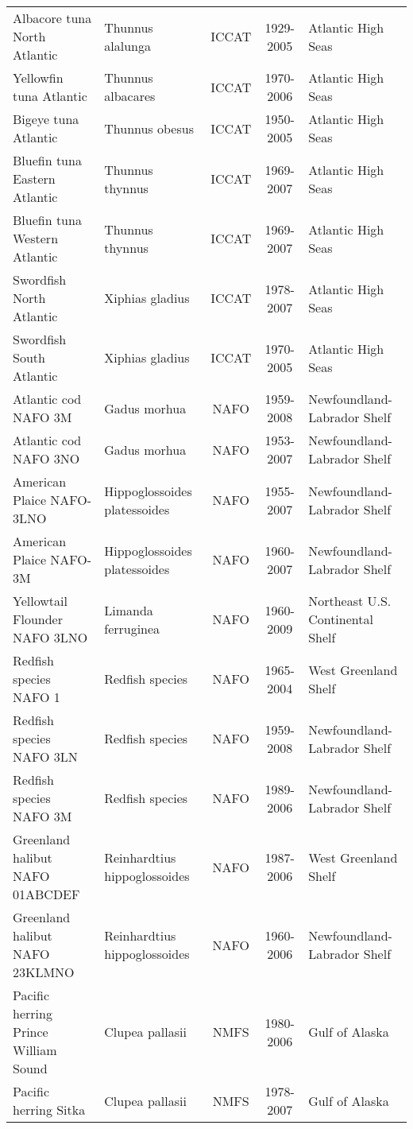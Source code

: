 \begin{longtable}{p{4cm}p{3.5cm}ccp{5.5cm}}
  Albacore tuna North Atlantic & Thunnus alalunga & ICCAT & 1929-2005 & Atlantic High Seas \\ 
  Yellowfin tuna Atlantic & Thunnus albacares & ICCAT & 1970-2006 & Atlantic High Seas \\ 
  Bigeye tuna Atlantic & Thunnus obesus & ICCAT & 1950-2005 & Atlantic High Seas \\ 
  Bluefin tuna Eastern Atlantic & Thunnus thynnus & ICCAT & 1969-2007 & Atlantic High Seas \\ 
  Bluefin tuna Western Atlantic & Thunnus thynnus & ICCAT & 1969-2007 & Atlantic High Seas \\ 
  Swordfish North Atlantic & Xiphias gladius & ICCAT & 1978-2007 & Atlantic High Seas \\ 
  Swordfish South Atlantic & Xiphias gladius & ICCAT & 1970-2005 & Atlantic High Seas \\ 
  Atlantic cod NAFO 3M & Gadus morhua & NAFO & 1959-2008 & Newfoundland-Labrador Shelf \\ 
  Atlantic cod NAFO 3NO & Gadus morhua & NAFO & 1953-2007 & Newfoundland-Labrador Shelf \\ 
  American Plaice NAFO-3LNO & Hippoglossoides platessoides & NAFO & 1955-2007 & Newfoundland-Labrador Shelf \\ 
  American Plaice NAFO-3M & Hippoglossoides platessoides & NAFO & 1960-2007 & Newfoundland-Labrador Shelf \\ 
  Yellowtail Flounder NAFO 3LNO & Limanda ferruginea & NAFO & 1960-2009 & Northeast U.S. Continental Shelf \\ 
  Redfish species NAFO 1 & Redfish species & NAFO & 1965-2004 & West Greenland Shelf \\ 
  Redfish species NAFO 3LN & Redfish species & NAFO & 1959-2008 & Newfoundland-Labrador Shelf \\ 
  Redfish species NAFO 3M & Redfish species & NAFO & 1989-2006 & Newfoundland-Labrador Shelf \\ 
  Greenland halibut NAFO 01ABCDEF & Reinhardtius hippoglossoides & NAFO & 1987-2006 & West Greenland Shelf \\ 
  Greenland halibut NAFO 23KLMNO & Reinhardtius hippoglossoides & NAFO & 1960-2006 & Newfoundland-Labrador Shelf \\ 
  Pacific herring Prince William Sound & Clupea pallasii & NMFS & 1980-2006 & Gulf of Alaska \\ 
  Pacific herring Sitka & Clupea pallasii & NMFS & 1978-2007 & Gulf of Alaska \\ 

\end{longtable}
